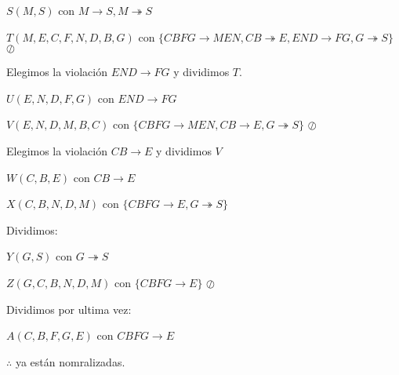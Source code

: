 \documentclass[12pt, letterpaper]{article}
\begin{document}
\begin{itemize}
\begin{itemize}
                                        $S(M,S)$ con $M\rightarrow S, M\twoheadrightarrow S$ \checkmark \vspace{.1cm}

                                        $T(M,E,C,F,N,D,B,G)$ con $\{CBFG\rightarrow MEN, CB\twoheadrightarrow E,END\rightarrow FG, G\twoheadrightarrow S\}$ $\oslash$\vspace{.3cm}

                                        Elegimos la violación $END \rightarrow FG$ y dividimos $T$.\vspace{.1cm}

                                        $U(E,N,D,F,G)$ con $END \rightarrow FG$ \checkmark\vspace{.1cm}

                                        $V(E,N,D,M,B,C)$ con $\{CBFG\rightarrow MEN, CB \rightarrow E, G\twoheadrightarrow S\}$\vspace{.3cm} $\oslash$\vspace{.3cm}

                                        Elegimos la violación $CB \rightarrow E$ y dividimos $V$ \vspace{.1cm}

                                        $W(C,B,E)$ con $CB\rightarrow E$ \checkmark \vspace{.1cm}

                                        $X(C,B,N,D,M)$ con $\{CBFG \rightarrow E, G\twoheadrightarrow S\}$\vspace{.3cm}
                                        
                                        Dividimos:\vspace{.1cm}

                                        $Y(G,S)$ con $G\twoheadrightarrow S$ \checkmark \vspace{.1cm}

                                        $Z(G,C,B,N,D,M)$ con $\{CBFG\rightarrow E\}$ $\oslash$\vspace{.3cm}

                                        Dividimos por ultima vez:\vspace{.1cm}

                                        $A(C,B,F,G,E)$ con $CBFG\rightarrow E$ \checkmark \vspace{.3cm}

                                        $\therefore$  ya están nomralizadas.


                \end{itemize}

    \end{itemize}
\end{document}
